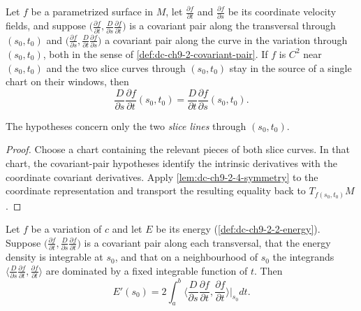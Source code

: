 \begin{lemma}
  \label{lem:dc-ch9-2-4-symmetry-manifold}
  \leanok
  Let $f$ be a parametrized surface in $M$, let $\frac{\partial f}{\partial t}$ and
  $\frac{\partial f}{\partial s}$ be its coordinate velocity fields, and suppose
  $\big(\frac{\partial f}{\partial t},\frac{D}{\partial s}\frac{\partial f}{\partial t}\big)$
  is a covariant pair along the transversal through $(s_0,t_0)$ and
  $\big(\frac{\partial f}{\partial s},\frac{D}{\partial t}\frac{\partial f}{\partial s}\big)$
  a covariant pair along the curve in the variation through $(s_0,t_0)$, both in the sense
  of \cref{def:dc-ch9-2-covariant-pair}. If $f$ is $C^2$ near $(s_0,t_0)$ and the two slice
  curves through $(s_0,t_0)$ stay in the source of a single chart on their windows, then
  $$
  \frac{D}{\partial s}\frac{\partial f}{\partial t}(s_0,t_0)
    = \frac{D}{\partial t}\frac{\partial f}{\partial s}(s_0,t_0).
  $$

  The hypotheses concern only the two \emph{slice lines} through $(s_0,t_0)$.
\end{lemma}
\begin{proof}
  \leanok
  \sketch
  Choose a chart containing the relevant pieces of both slice curves. In that chart,
  the covariant-pair hypotheses identify the intrinsic derivatives with the coordinate
  covariant derivatives. Apply \cref{lem:dc-ch9-2-4-symmetry} to the coordinate
  representation and transport the resulting equality back to $T_{f(s_0,t_0)}M$.

\end{proof}
\begin{lemma}
  \label{lem:dc-ch9-2-4-under-integral}
  \leanok
  Let $f$ be a variation of $c$ and let $E$ be its energy (\cref{def:dc-ch9-2-2-energy}).
  Suppose $\big(\frac{\partial f}{\partial t},\frac{D}{\partial s}\frac{\partial f}{\partial t}\big)$
  is a covariant pair along each transversal, that the energy density is integrable at
  $s_0$, and that on a neighbourhood of $s_0$ the integrands
  $\big\langle\frac{D}{\partial s}\frac{\partial f}{\partial t},\frac{\partial f}{\partial t}\big\rangle$
  are dominated by a fixed integrable function of $t$. Then
  $$
  E'(s_0)
    = 2\int_a^b\Big\langle\frac{D}{\partial s}\frac{\partial f}{\partial t},\frac{\partial f}{\partial t}\Big\rangle\Big|_{s_0} dt .
  $$

\end{lemma}
